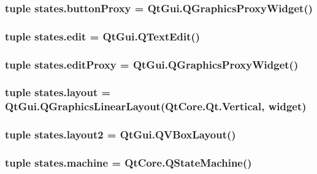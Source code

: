 \subsubsection[{button\+Proxy}]{\setlength{\rightskip}{0pt plus 5cm}tuple states.\+button\+Proxy = Qt\+Gui.\+Q\+Graphics\+Proxy\+Widget()}\label{namespacestates_ab4f1d20293f951de72c060e085560681}
\hypertarget{namespacestates_ae029cf3c21cbcdd8fa88586878492edc}{}
\subsubsection[{edit}]{\setlength{\rightskip}{0pt plus 5cm}tuple states.\+edit = Qt\+Gui.\+Q\+Text\+Edit()}\label{namespacestates_ae029cf3c21cbcdd8fa88586878492edc}
\hypertarget{namespacestates_a98cf7e360f4a80c35791d3d1493fbf26}{}
\subsubsection[{edit\+Proxy}]{\setlength{\rightskip}{0pt plus 5cm}tuple states.\+edit\+Proxy = Qt\+Gui.\+Q\+Graphics\+Proxy\+Widget()}\label{namespacestates_a98cf7e360f4a80c35791d3d1493fbf26}
\hypertarget{namespacestates_ac759b5911bd2caa864d8b83547b4e064}{}
\subsubsection[{layout}]{\setlength{\rightskip}{0pt plus 5cm}tuple states.\+layout = Qt\+Gui.\+Q\+Graphics\+Linear\+Layout(Qt\+Core.\+Qt.\+Vertical, {\bf widget})}\label{namespacestates_ac759b5911bd2caa864d8b83547b4e064}
\hypertarget{namespacestates_ac05f4090fe16a6235c90028a4a4b8815}{}
\subsubsection[{layout2}]{\setlength{\rightskip}{0pt plus 5cm}tuple states.\+layout2 = Qt\+Gui.\+Q\+V\+Box\+Layout()}\label{namespacestates_ac05f4090fe16a6235c90028a4a4b8815}
\hypertarget{namespacestates_aa350e8361ac007a1609c03c4b9ec0b45}{}
\subsubsection[{machine}]{\setlength{\rightskip}{0pt plus 5cm}tuple states.\+machine = Qt\+Core.\+Q\+State\+Machine()}\label{namespacestates_aa350e8361ac007a1609c03c4b9ec0b45}
\hypertarget{namespacestates_ae8f66049ab43399ddd8c9f0a2f9ce543}{}
